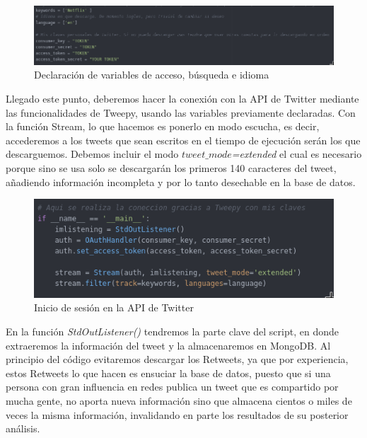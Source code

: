 \begin{figure}[h]
	\centering
	\includegraphics[scale=.4]{imagenes/token-ladron.png}
	\caption{Declaración de variables de acceso, búsqueda e idioma}
	\label{fig:token-ladron}
\end{figure}


Llegado este punto, deberemos hacer la conexión con la API de Twitter mediante las funcionalidades de Tweepy, usando las variables previamente declaradas. Con la función Stream, lo que hacemos es ponerlo en modo escucha, es decir, accederemos a los tweets que sean escritos en el tiempo de ejecución serán los que descarguemos. Debemos incluir el modo \textit{$tweet\_mode$=extended} el cual es necesario porque sino se usa solo se descargarán los primeros 140 caracteres del tweet, añadiendo información incompleta y por lo tanto desechable en la base de datos. 

\begin{figure}[h]
	\centering
	\includegraphics[scale=.5]{imagenes/inicio-sesion-ladron.png}
	\caption{Inicio de sesión en la API de Twitter}
	\label{fig:inicio-sesion-ladron}
\end{figure}


En la función \textit{StdOutListener()} tendremos la parte clave del script, en donde extraeremos la información del tweet y la almacenaremos en MongoDB. Al principio del código evitaremos descargar los Retweets, ya que por experiencia, estos Retweets lo que hacen es ensuciar la base de datos, puesto que si una persona con gran influencia en redes publica un tweet que es compartido por mucha gente, no aporta nueva información sino que almacena cientos o miles de veces la misma información, invalidando en parte los resultados de su posterior análisis. 

